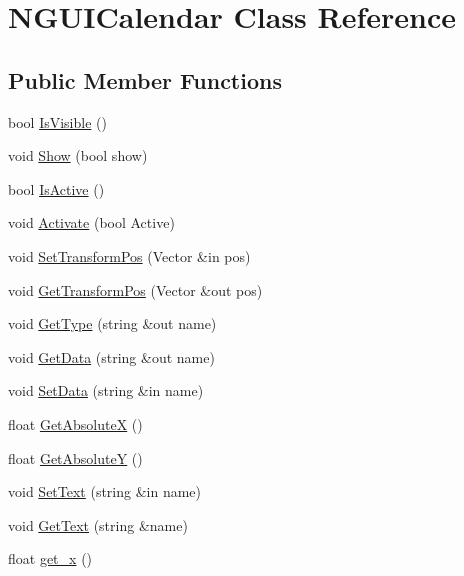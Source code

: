 \hypertarget{class_n_g_u_i_calendar}{}\section{N\+G\+U\+I\+Calendar Class Reference}
\label{class_n_g_u_i_calendar}
\subsection*{Public Member Functions}
\begin{DoxyCompactItemize}
\item 
bool \hyperlink{class_n_g_u_i_calendar_a4c26f3e403f88f628f71bd5010b6dbe0}{Is\+Visible} ()
\item 
void \hyperlink{class_n_g_u_i_calendar_a24d8a3493ecd99c602b692be562055c1}{Show} (bool show)
\item 
bool \hyperlink{class_n_g_u_i_calendar_a9996bb93328854e08e853038da0a9b9b}{Is\+Active} ()
\item 
void \hyperlink{class_n_g_u_i_calendar_af04ef224369ac711a7590db57ee0066f}{Activate} (bool Active)
\item 
void \hyperlink{class_n_g_u_i_calendar_a4463bd24207cc6f2c76bd4433d2cd946}{Set\+Transform\+Pos} (Vector \&in pos)
\item 
void \hyperlink{class_n_g_u_i_calendar_aeda181a3802c06043e0fcdfa17d02a1e}{Get\+Transform\+Pos} (Vector \&out pos)
\item 
void \hyperlink{class_n_g_u_i_calendar_a7d49c34fa1f2b8f78f391fa5cda0048a}{Get\+Type} (string \&out name)
\item 
void \hyperlink{class_n_g_u_i_calendar_a90ec609120d5ca7f4ed533bd5d8dbeaa}{Get\+Data} (string \&out name)
\item 
void \hyperlink{class_n_g_u_i_calendar_a5eebfc3d7dea7ec38292530cfc3d698a}{Set\+Data} (string \&in name)
\item 
float \hyperlink{class_n_g_u_i_calendar_a7dfbb8437e25e959a1ab7fdf15032823}{Get\+AbsoluteX} ()
\item 
float \hyperlink{class_n_g_u_i_calendar_a4f9f1add65e8b5a3a19180b8986ac582}{Get\+AbsoluteY} ()
\item 
void \hyperlink{class_n_g_u_i_calendar_a0bc6fdb288ca331c507184183d712c51}{Set\+Text} (string \&in name)
\item 
void \hyperlink{class_n_g_u_i_calendar_a17f88e0f70bcbdb67c5b8c47bac53bec}{Get\+Text} (string \&name)
\item 
float \hyperlink{class_n_g_u_i_calendar_a556619834b80ed1b2128b38eb8351e5e}{get\+\_\+x} ()

\end{DoxyCompactItemize}
